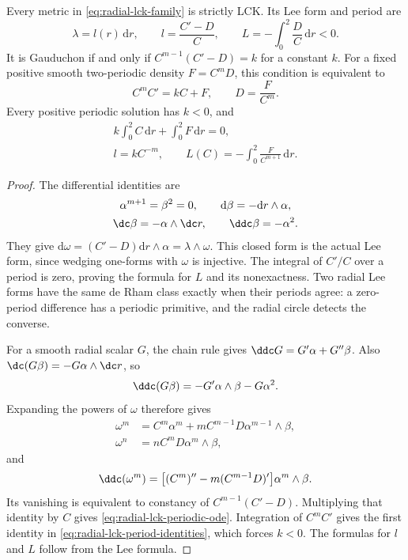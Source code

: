 \begin{lemma}\label{lem:radial-lck-gauduchon-equation}
Every metric in \eqref{eq:radial-lck-family} is strictly LCK. Its Lee form and period are
\[
 \lambda=l(r)\,\mathrm dr,\qquad
 l=\frac{C'-D}{C},\qquad
 L=-\int_0^2\frac{D}{C}\,\mathrm dr<0.
\]
It is Gauduchon if and only if $C^{m-1}(C'-D)=k$ for a constant $k$. For a fixed positive smooth two-periodic density $F=C^mD$, this condition is equivalent to
\begin{equation}\label{eq:radial-lck-periodic-ode}
 C^mC'=kC+F,\qquad D=\frac{F}{C^m}.
\end{equation}
Every positive periodic solution has $k<0$, and
\begin{equation}\label{eq:radial-lck-period-identities}
 \begin{gathered}
 k\int_0^2C\,\mathrm dr+\int_0^2F\,\mathrm dr=0,
 \\
 l=kC^{-m},\qquad
 L(C)=-\int_0^2\frac{F}{C^{m+1}}\,\mathrm dr.
 \end{gathered}
\end{equation}
\end{lemma}
\begin{proof}
The differential identities are
\[
 \begin{gathered}
 \alpha^{m+1}=\beta^2=0,\qquad
 \mathrm d\beta=-\mathrm dr\wedge\alpha,\\
 \dc\beta=-\alpha\wedge\dc r,\qquad
 \ddc\beta=-\alpha^2.
 \end{gathered}
\]
They give $\mathrm d\omega=(C'-D)\mathrm dr\wedge\alpha=\lambda\wedge\omega$. This closed form is the actual Lee form, since wedging one-forms with $\omega$ is injective. The integral of $C'/C$ over a period is zero, proving the formula for $L$ and its nonexactness. Two radial Lee forms have the same de Rham class exactly when their periods agree: a zero-period difference has a periodic primitive, and the radial circle detects the converse.

For a smooth radial scalar $G$, the chain rule gives $\ddc G=G'\alpha+G''\beta$. Also $\dc(G\beta)=-G\alpha\wedge\dc r$, so
\[
 \ddc(G\beta)=-G'\alpha\wedge\beta-G\alpha^2.
\]
Expanding the powers of $\omega$ therefore gives
\[
 \begin{aligned}
 \omega^m&=C^m\alpha^m+mC^{m-1}D\alpha^{m-1}\wedge\beta,\\
 \omega^n&=nC^mD\alpha^m\wedge\beta,
 \end{aligned}
\]
and
\[
 \ddc(\omega^m)=
 \bigl[(C^m)''-m(C^{m-1}D)'\bigr]\alpha^m\wedge\beta.
\]
Its vanishing is equivalent to constancy of $C^{m-1}(C'-D)$. Multiplying that identity by $C$ gives \eqref{eq:radial-lck-periodic-ode}. Integration of $C^mC'$ gives the first identity in \eqref{eq:radial-lck-period-identities}, which forces $k<0$. The formulas for $l$ and $L$ follow from the Lee formula.
\end{proof}

